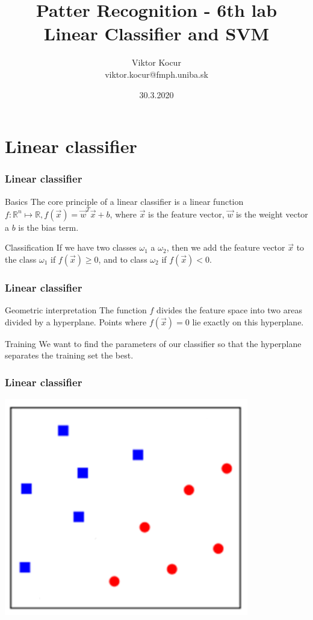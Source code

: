 \documentclass{beamer}
\title[PCA a LDA]{Patter Recognition - 6th lab \\ Linear Classifier and SVM}
\author[Viktor Kocur]{Viktor Kocur \\{\small viktor.kocur@fmph.uniba.sk}}
\institute{DAI FMFI UK}
\date{30.3.2020}
\begin{document}

\begin{frame}[plain]
  \titlepage  
\end{frame}

\section{Linear classifier}

\begin{frame}
\frametitle{Linear classifier}
\begin{block}{Basics}
The core principle of a linear classifier is a linear function $f : \mathbb{R}^n \mapsto \mathbb{R}, f(\vec{x}) = \vec{w}^T \vec{x} + b$, where $\vec{x}$ is the feature vector, $\vec{w}$ is the weight vector a $b$ is the bias term.
\end{block}

\begin{block}{Classification}
If we have two classes $\omega_1$ a $\omega_2$, then we add the feature vector $\vec{x}$ to the class $\omega_1$ if $f(\vec{x}) \ge 0$, and to class $\omega_2$ if $f(\vec{x}) < 0$.
\end{block}
\end{frame}



\begin{frame}
\frametitle{Linear classifier}
\begin{block}{Geometric interpretation}
The function $f$ divides the feature space into two areas divided by a hyperplane. Points where $f(\vec{x}) = 0$ lie exactly on this hyperplane.
\end{block}

\begin{block}{Training}
We want to find the parameters of our classifier so that the hyperplane separates the training set the best.
\end{block}
\end{frame}


\begin{frame}
\frametitle{Linear classifier}
\center
\includegraphics[width=0.8\textwidth]{lc1.png}
\end{frame}
\end{document}
